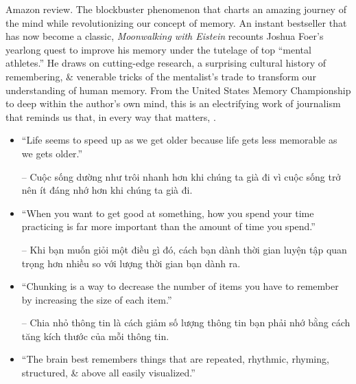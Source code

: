 \documentclass{article}
\begin{document}
\begin{enumerate}
	{\sf Amazon review.} The blockbuster phenomenon that charts an amazing journey of the mind while revolutionizing our concept of memory. An instant bestseller that has now become a classic, {\it Moonwalking with {\sc Eistein}} recounts {\sc Joshua Foer}'s yearlong quest to improve his memory under the tutelage of top ``mental athletes.'' He draws on cutting-edge research, a surprising cultural history of remembering, \& venerable tricks of the mentalist's trade to transform our understanding of human memory. From the United States Memory Championship to deep within the author's own mind, this is an electrifying work of journalism that reminds us that, in every way that matters, .
	\begin{itemize}
		\item ``Life seems to speed up as we get older because life gets less memorable as we gets older.''
		
		-- Cuộc sống dường như trôi nhanh hơn khi chúng ta già đi vì cuộc sống trở nên ít đáng nhớ hơn khi chúng ta già đi.
		\item ``When you want to get good at something, how you spend your time practicing is far more important than the amount of time you spend.''
		
		-- Khi bạn muốn giỏi một điều gì đó, cách bạn dành thời gian luyện tập quan trọng hơn nhiều so với lượng thời gian bạn dành ra.
		\item ``Chunking is a way to decrease the number of items you have to remember by increasing the size of each item.''
		
		-- Chia nhỏ thông tin là cách giảm số lượng thông tin bạn phải nhớ bằng cách tăng kích thước của mỗi thông tin.		
		\item ``The brain best remembers things that are repeated, rhythmic, rhyming, structured, \& above all easily visualized.''
		

\end{itemize}
\end{enumerate}
\end{document}

